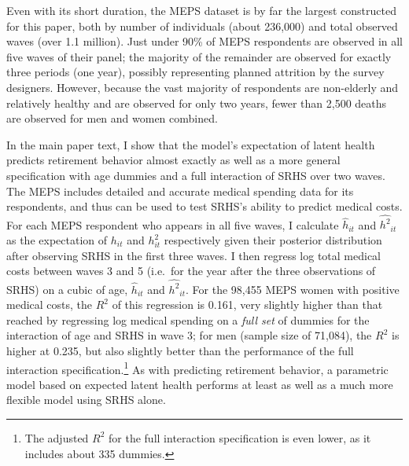 \documentclass[12pt,pdftex,letterpaper]{article}
\newcommand{\Health}{h}
\newcommand{\RootDir}{..}
\newcommand{\TablesDir}{\RootDir/Tables}
\begin{document}
Even with its short duration, the MEPS dataset is by far the largest constructed for this paper, both by number of individuals (about 236,000) and total observed waves (over 1.1 million).  Just under 90\% of MEPS respondents are observed in all five waves of their panel; the majority of the remainder are observed for exactly three periods (one year), possibly representing planned attrition by the survey designers.  However, because the vast majority of respondents are non-elderly and relatively healthy and are observed for only two years, fewer than 2,500 deaths are observed for men and women combined.

In the main paper text, I show that the model's expectation of latent health predicts retirement behavior almost exactly as well as a more general specification with age dummies and a full interaction of SRHS over two waves.  The MEPS includes detailed and accurate medical spending data for its respondents, and thus can be used to test SRHS's ability to predict medical costs. For each MEPS respondent who appears in all five waves, I calculate $\widehat{\Health}_{it}$ and $\widehat{\Health^2}_{it}$ as the expectation of $\Health_{it}$ and $\Health^2_{it}$ respectively given their posterior distribution after observing SRHS in the first three waves.  I then regress log total medical costs between waves 3 and 5 (i.e.\ for the year after the three observations of SRHS) on a cubic of age, $\widehat{\Health}_{it}$ and $\widehat{\Health^2}_{it}$.  For the 98,455 MEPS women with positive medical costs, the $R^2$ of this regression is 0.161, very slightly higher than that reached by regressing log medical spending on a \textit{full set} of dummies for the interaction of age and SRHS in wave 3; for men (sample size of 71,084), the $R^2$ is higher at 0.235, but also slightly better than the performance of the full interaction specification.\footnote{The adjusted $R^2$ for the full interaction specification is even lower, as it includes about 335 dummies.} As with predicting retirement behavior, a parametric model based on expected latent health performs at least as well as a much more flexible model using SRHS alone.


\end{document}
